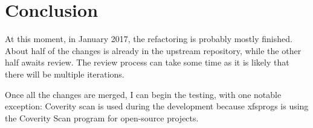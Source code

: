 
\chapter{Conclusion} \label{chap:conclusion}

At this moment, in January 2017, the refactoring is probably mostly finished. About half of the changes is already in the upstream repository, while the other half awaits review. The review process can take some time as it is likely that there will be multiple iterations.

Once all the changes are merged, I can begin the testing, with one notable exception: Coverity scan is used during the development because xfsprogs is using the Coverity Scan program for open-source projects.

